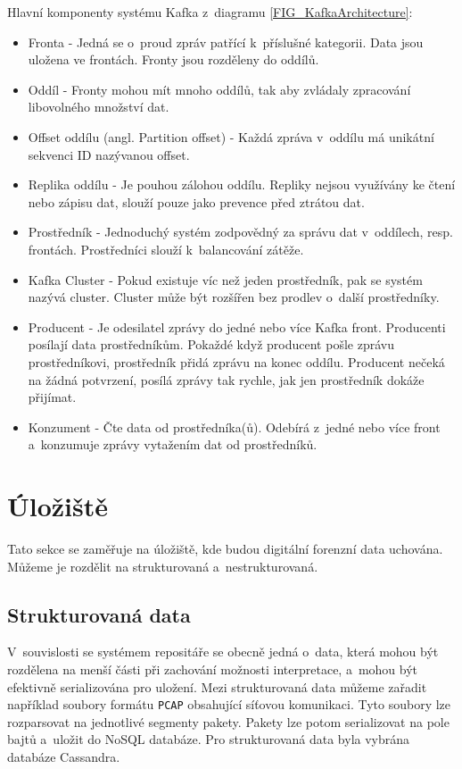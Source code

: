 \vspace{0.5cm}
\noindent Hlavní komponenty systému Kafka z~diagramu \ref{FIG_KafkaArchitecture}:
\begin{itemize}
    \item Fronta - Jedná se o~proud zpráv patřící k~příslušné kategorii. Data jsou uložena ve frontách. Fronty jsou rozděleny do oddílů.
    
    \item Oddíl - Fronty mohou mít mnoho oddílů, tak aby zvládaly zpracování libovolného množství dat.

    \item Offset oddílu (angl. Partition offset) - Každá zpráva v~oddílu má unikátní sekvenci ID nazývanou offset.

    \item Replika oddílu - Je pouhou zálohou oddílu. Repliky nejsou využívány ke čtení nebo zápisu dat, slouží pouze jako prevence před ztrátou dat.
    
    \item Prostředník - Jednoduchý systém zodpovědný za správu dat v~oddílech, resp. frontách. Prostředníci slouží k~balancování zátěže.
    
    \item Kafka Cluster - Pokud existuje víc než jeden prostředník, pak se systém nazývá cluster. Cluster může být rozšířen bez prodlev o~další prostředníky.
    
    \item Producent - Je odesilatel zprávy do jedné nebo více Kafka front. Producenti posílají data prostředníkům. Pokaždé když producent pošle zprávu prostředníkovi, prostředník přidá zprávu na konec oddílu. Producent nečeká na žádná potvrzení, posílá zprávy tak rychle, jak jen prostředník dokáže přijímat.
    
    \item Konzument - Čte data od prostředníka(ů). Odebírá z~jedné nebo více front a~konzumuje zprávy vytažením dat od prostředníků.
\end{itemize}

\section{Úložiště}
Tato sekce se zaměřuje na úložiště, kde budou digitální forenzní data uchována. Můžeme je rozdělit na strukturovaná a~nestrukturovaná.

\subsection{Strukturovaná data}
V~souvislosti se systémem repositáře se obecně jedná o~data, která mohou být rozdělena na menší části při zachování možnosti interpretace, a~mohou být efektivně serializována pro uložení. Mezi strukturovaná data můžeme zařadit například soubory formátu \texttt{PCAP} obsahující síťovou komunikaci. Tyto soubory lze rozparsovat na jednotlivé segmenty pakety. Pakety lze potom serializovat na pole bajtů a~uložit do NoSQL databáze. Pro strukturovaná data byla vybrána databáze Cassandra.

